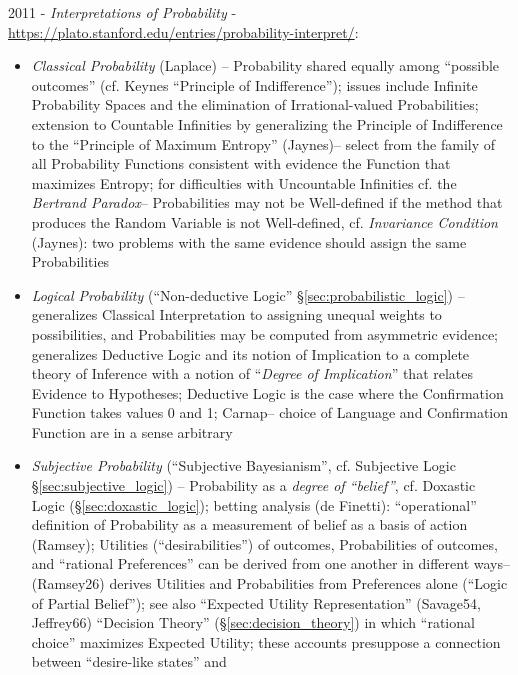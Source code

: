 2011 - \emph{Interpretations of Probability} -
\url{https://plato.stanford.edu/entries/probability-interpret/}:
\begin{itemize}
  \item \emph{Classical Probability} (Laplace) -- Probability shared equally
    among ``possible outcomes'' (cf. Keynes ``Principle of Indifference'');
    issues include Infinite Probability Spaces and the elimination of
    Irrational-valued Probabilities; extension to Countable Infinities by
    generalizing the Principle of Indifference to the ``Principle of Maximum
    Entropy'' (Jaynes)-- select from the family of all Probability Functions
    consistent with evidence the Function that maximizes Entropy; for
    difficulties with Uncountable Infinities cf. the \emph{Bertrand Paradox}--
    Probabilities may not be Well-defined if the method that produces the Random
    Variable is not Well-defined, cf. \emph{Invariance Condition} (Jaynes): two
    problems with the same evidence should assign the same Probabilities
  \item \emph{Logical Probability} (``Non-deductive Logic''
    \S\ref{sec:probabilistic_logic}) -- generalizes Classical Interpretation to
    assigning unequal weights to possibilities, and Probabilities may be
    computed from asymmetric evidence; generalizes Deductive Logic and its
    notion of Implication to a complete theory of Inference with a notion of
    ``\emph{Degree of Implication}'' that relates Evidence to Hypotheses;
    Deductive Logic is the case where the Confirmation Function takes values 0
    and 1; Carnap-- choice of Language and Confirmation Function are in a sense
    arbitrary
  \item \emph{Subjective Probability} (``Subjective Bayesianism'', cf.
    Subjective Logic \S\ref{sec:subjective_logic}) --
    Probability as a \emph{degree of ``belief''}, cf. Doxastic Logic
    (\S\ref{sec:doxastic_logic}); betting analysis (de Finetti): ``operational''
    definition of Probability as a measurement of belief as a basis of action
    (Ramsey); Utilities (``desirabilities'') of outcomes, Probabilities of
    outcomes, and ``rational Preferences'' can be derived from one another in
    different ways-- (Ramsey26) derives Utilities and Probabilities from
    Preferences alone (``Logic of Partial Belief''); see also ``Expected Utility
    Representation'' (Savage54, Jeffrey66) ``Decision Theory''
    (\S\ref{sec:decision_theory}) in which ``rational choice'' maximizes
    Expected Utility;
    these accounts presuppose a connection between ``desire-like states'' and

\end{itemize}
